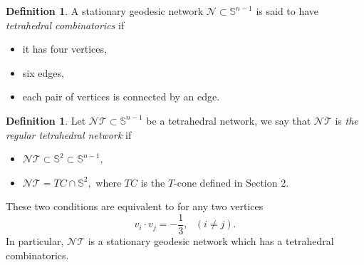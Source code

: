 \documentclass[11pt]{amsart}
\numberwithin{equation}{section}
\theoremstyle{theorem}
\theoremstyle{definition}
\newtheorem{definition}[theorem]{Definition}
\numberwithin{equation}{section}
\begin{document}
\begin{definition}
A stationary geodesic network $\mathcal N\subset \mathbb S^{n-1}$ is said
to have \emph{tetrahedral combinatorics} if

\begin{itemize}
\item it has four vertices,
\item six edges,
\item each pair of vertices is connected by an edge.
\end{itemize}
\end{definition}

\begin{definition}
    Let $\mathcal{NT}\subset \mathbb S^{n-1}$ be a tetrahedral network, we say that $\mathcal{NT}$ is \emph{the regular tetrahedral network} if 

    \begin{itemize}
        \item $\mathcal{NT}\subset \mathbb{S}^2 \subset \mathbb S^{n-1},$
        \item $\mathcal{NT}=TC\cap \mathbb{S}^2,$
    where $TC$ is the $T$-cone defined in Section 2.
         \end{itemize}
       These two conditions are equivalent to for any two vertices
       $$
       v_i\cdot v_j=-\frac{1}{3},\ \ \  (i\neq j).
       $$
       In particular, $\mathcal{NT}$ is a stationary geodesic network which has a tetrahedral combinatorics.  
\end{definition}
 
\end{document}
